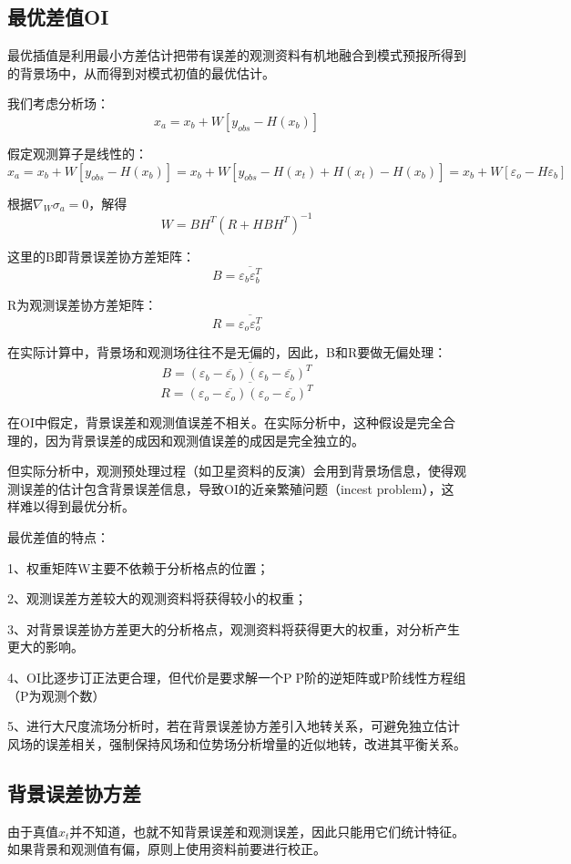 \documentclass{article}
\begin{document}
\subsection{最优差值OI}
最优插值是利用最小方差估计把带有误差的观测资料有机地融合到模式预报所得到的背景场中，从而得到对模式初值的最优估计。

我们考虑分析场：
$$x_a = x_b + W[y_{obs} - H(x_b)]$$

假定观测算子是线性的：
$$x_a = x_b + W[y_{obs} - H(x_b)] =  x_b + W[y_{obs}-H(x_t)+H(x_t)-H(x_b)]=x_b + W[\varepsilon_o-H\varepsilon_b]$$

根据$\nabla_W \sigma_a = 0$，解得
$$W = BH^T(R + HBH^T)^{-1}$$

这里的B即背景误差协方差矩阵：
$$B=\overline{\varepsilon_b\varepsilon_b^T}$$

R为观测误差协方差矩阵：
$$R=\overline{\varepsilon_o\varepsilon_o^T}$$

在实际计算中，背景场和观测场往往不是无偏的，因此，B和R要做无偏处理：
$$B=\overline{(\varepsilon_b-\overline{\varepsilon_b})(\varepsilon_b-\overline{\varepsilon_b})^T}$$
$$R=\overline{(\varepsilon_o-\overline{\varepsilon_o})(\varepsilon_o-\overline{\varepsilon_o})^T}$$

在OI中假定，背景误差和观测值误差不相关。在实际分析中，这种假设是完全合理的，因为背景误差的成因和观测值误差的成因是完全独立的。

但实际分析中，观测预处理过程（如卫星资料的反演）会用到背景场信息，使得观测误差的估计包含背景误差信息，导致OI的近亲繁殖问题（incest problem），这样难以得到最优分析。

最优差值的特点：

1、权重矩阵W主要不依赖于分析格点的位置；

2、观测误差方差较大的观测资料将获得较小的权重；

3、对背景误差协方差更大的分析格点，观测资料将获得更大的权重，对分析产生更大的影响。  

4、OI比逐步订正法更合理，但代价是要求解一个PP阶的逆矩阵或P阶线性方程组（P为观测个数）

5、进行大尺度流场分析时，若在背景误差协方差引入地转关系，可避免独立估计风场的误差相关，强制保持风场和位势场分析增量的近似地转，改进其平衡关系。


\subsection{背景误差协方差}
由于真值$x_t$并不知道，也就不知背景误差和观测误差，因此只能用它们统计特征。如果背景和观测值有偏，原则上使用资料前要进行校正。
\end{document}
